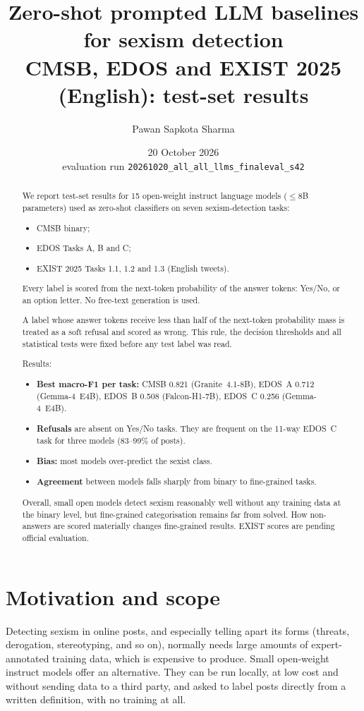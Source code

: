 \documentclass[11pt]{article}
\title{Zero-shot prompted LLM baselines for sexism detection\\[2pt]
\large CMSB, EDOS and EXIST 2025 (English): test-set results}
\author{Pawan Sapkota Sharma}
\date{20 October 2026 \\ \small evaluation run \texttt{20261020\_all\_all\_llms\_finaleval\_s42}}
\begin{document}
\maketitle

\begin{abstract}
We report test-set results for 15 open-weight instruct language models ($\leq$8B parameters) used as zero-shot classifiers on seven sexism-detection tasks:
\begin{itemize}
  \item CMSB binary;
  \item EDOS Tasks A, B and C;
  \item EXIST 2025 Tasks 1.1, 1.2 and 1.3 (English tweets).
\end{itemize}
Every label is scored from the next-token probability of the answer tokens: Yes/No, or an option letter. No free-text generation is used.

A label whose answer tokens receive less than half of the next-token probability mass is treated as a soft refusal and scored as wrong. This rule, the decision thresholds and all statistical tests were fixed before any test label was read.

Results:
\begin{itemize}
  \item \textbf{Best macro-F1 per task:} CMSB 0.821 (Granite~4.1-8B), EDOS~A 0.712 (Gemma-4~E4B), EDOS~B 0.508 (Falcon-H1-7B), EDOS~C 0.256 (Gemma-4~E4B).
  \item \textbf{Refusals} are absent on Yes/No tasks. They are frequent on the 11-way EDOS~C task for three models (83--99\% of posts).
  \item \textbf{Bias:} most models over-predict the sexist class.
  \item \textbf{Agreement} between models falls sharply from binary to fine-grained tasks.
\end{itemize}
Overall, small open models detect sexism reasonably well without any training data at the binary level, but fine-grained categorisation remains far from solved. How non-answers are scored materially changes fine-grained results. EXIST scores are pending official evaluation.
\end{abstract}

\section{Motivation and scope}
Detecting sexism in online posts, and especially telling apart its forms (threats, derogation, stereotyping, and so on), normally needs large amounts of expert-annotated training data, which is expensive to produce. Small open-weight instruct models offer an alternative. They can be run locally, at low cost and without sending data to a third party, and asked to label posts directly from a written definition, with no training at all.
\end{document}

